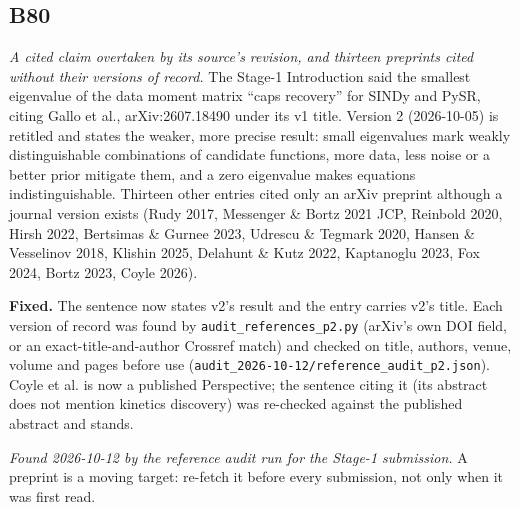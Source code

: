 \documentclass[10pt]{article}
\begin{document}
\subsection*{B80}\label{led:B80}
\begin{description}[leftmargin=0pt,itemsep=1pt]
\item[Defect.] \emph{A cited claim overtaken by its source's revision, and thirteen preprints cited without their versions of record.} The Stage-1 Introduction said the smallest eigenvalue of the data moment matrix ``caps recovery'' for SINDy and PySR, citing Gallo et al., arXiv:2607.18490 under its v1 title. Version 2 (2026-10-05) is retitled and states the weaker, more precise result: small eigenvalues mark weakly distinguishable combinations of candidate functions, more data, less noise or a better prior mitigate them, and a zero eigenvalue makes equations indistinguishable. Thirteen other entries cited only an arXiv preprint although a journal version exists (Rudy 2017, Messenger \& Bortz 2021 JCP, Reinbold 2020, Hirsh 2022, Bertsimas \& Gurnee 2023, Udrescu \& Tegmark 2020, Hansen \& Vesselinov 2018, Klishin 2025, Delahunt \& Kutz 2022, Kaptanoglu 2023, Fox 2024, Bortz 2023, Coyle 2026).
\item[Resolution.] \textbf{Fixed.} The sentence now states v2's result and the entry carries v2's title. Each version of record was found by \texttt{audit\_references\_p2.py} (arXiv's own DOI field, or an exact-title-and-author Crossref match) and checked on title, authors, venue, volume and pages before use (\texttt{audit\_2026-10-12/reference\_audit\_p2.json}). Coyle et al. is now a published Perspective; the sentence citing it (its abstract does not mention kinetics discovery) was re-checked against the published abstract and stands.
\item[Note.] \emph{Found 2026-10-12 by the reference audit run for the Stage-1 submission.} A preprint is a moving target: re-fetch it before every submission, not only when it was first read.
\end{description}
\end{document}
